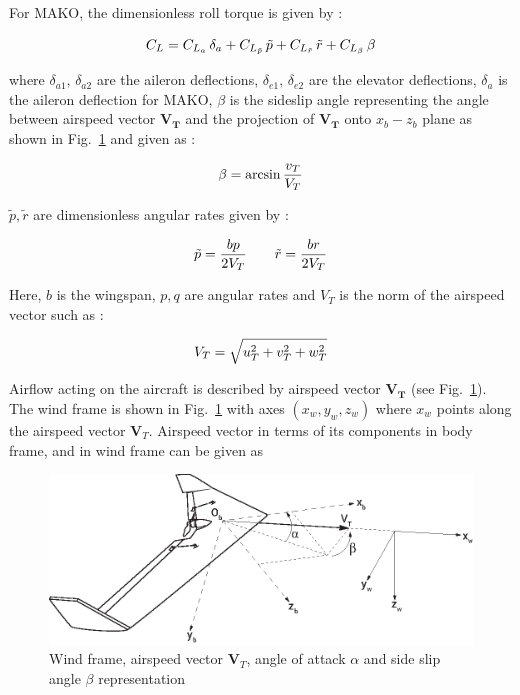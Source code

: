 For MAKO, the dimensionless roll torque is given by :

\begin{equation}{\label{eqn:makoC_L}}
C_L = C_{L_{a}} \, \delta_{a} + C_{L_{\tilde{p}}} \, \tilde{p} + C_{L_{\tilde{r}}} \, \tilde{r} +  C_{L_\beta} \, \beta 
\end{equation}

where $\delta_{a1},\,\delta_{a2}$ are the aileron deflections, $\delta_{e1},\, \delta_{e2}$ are the elevator deflections, $\delta_a$ is the aileron deflection for MAKO, $\beta$ is the sideslip angle representing the angle between airspeed vector $\bm{V_T}$ and the projection of $\bm{V_T}$ onto $x_b-z_b$ plane as shown in Fig.~\ref{fig:windFrame} and given as :

\begin{equation}{\label{eqn:sideslipAngle}}
\beta = \arcsin{\frac{v_T}{V_T}}
\end{equation}

$\tilde{p}, \tilde{r}$ are dimensionless angular rates given by :

 \begin{equation}{\label{eqn:dimensionlessAngularVelocties}}
\tilde{p}=\frac{bp}{2V_T} \qquad \tilde{r}=\frac{br}{2V_T}
\end{equation}

Here, $b$ is the wingspan, $p,q$ are angular rates and $V_T$ is the norm of the airspeed vector such as :

\begin{equation}{\label{eqn:airspeedVector}}
V_T=\sqrt{u_T^2 + v_T^2 + w_T^2}
\end{equation}

Airflow acting on the aircraft is described by airspeed vector $\bm{V_T}$ (see Fig.~\ref{fig:windFrame}). The wind frame is shown in Fig.~\ref{fig:windFrame} with axes $(x_w, y_w, z_w)$ where $x_w$ points along the airspeed vector $\bm{V}_T$.
Airspeed vector in terms of its components in body frame, and in wind frame can be given as

\begin{figure}
\begin{center}
\includegraphics[width=15cm]{figures/ZagiWindframe}    %
\caption{Wind frame, airspeed vector $\bm{V}_T$, angle of attack $\alpha$ and side slip angle $\beta$ representation \cite{ducard2009fault}} 
\label{fig:windFrame}
\end{center}
\end{figure}

